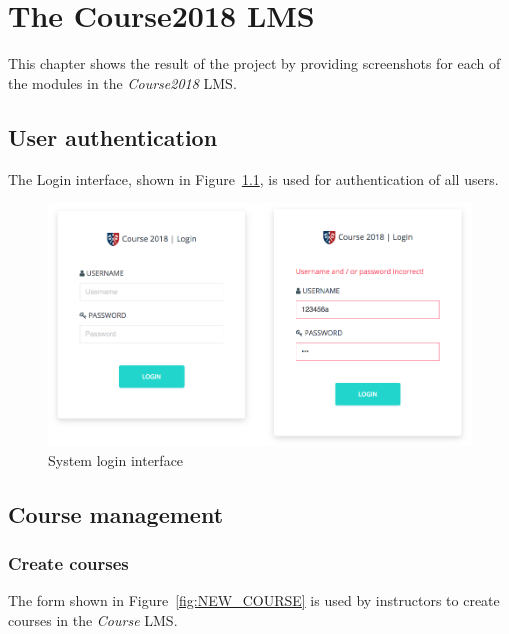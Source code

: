 

\chapter{The Course2018 LMS}
\label{chap:RSLT}

This chapter shows the result of the project by providing screenshots for
each of the modules in the \emph{Course2018} LMS.

\section{User authentication}
The Login interface, shown in Figure~\ref{fig:LOGIN}, is used for authentication
of all users.
\begin{figure}[H]
    \centering
        \includegraphics[width=.9\textwidth]{figures/login}
    \caption{System login interface}
    \label{fig:LOGIN}
\end{figure}

\section{Course management}

\subsection{Create courses}
The form shown in Figure~\ref{fig:NEW_COURSE} is used by instructors to create
courses in the \emph{Course} LMS.

